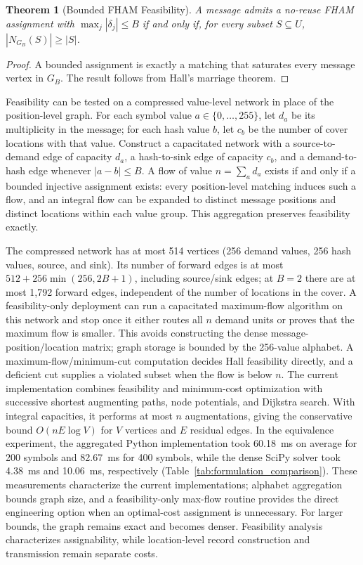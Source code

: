 \documentclass[preprint,12pt]{elsarticle}
\theoremstyle{plain}
\newtheorem{theorem}{Theorem}
\begin{document}
\begin{theorem}[Bounded FHAM Feasibility]
\label{thm:bounded_feasibility}
A message admits a no-reuse FHAM assignment with
$\max_j|\delta_j|\leq B$ if and only if, for every subset $S\subseteq U$,
$|N_{G_B}(S)|\geq|S|$.
\end{theorem}
\begin{proof}
A bounded assignment is exactly a matching that saturates every message vertex
in $G_B$. The result follows from Hall's marriage theorem.
\end{proof}

Feasibility can be tested on a compressed value-level network in place of
the position-level graph. For each symbol value $a\in\{0,\ldots,255\}$, let $d_a$ be its
multiplicity in the message; for each hash value $b$, let $c_b$ be the number
of cover locations with that value. Construct a capacitated network with a
source-to-demand edge of capacity $d_a$, a hash-to-sink edge of capacity
$c_b$, and a demand-to-hash edge whenever $|a-b|\leq B$. A flow of value
$n=\sum_a d_a$ exists if and only if a bounded injective assignment exists:
every position-level matching induces such a flow, and an integral flow can
be expanded to distinct message positions and distinct locations within each
value group. This aggregation preserves feasibility exactly.

The compressed network has at most 514 vertices (256 demand values, 256 hash
values, source, and sink). Its number of forward edges is at most
$512+256\min(256,2B+1)$, including source/sink edges; at $B=2$ there are at
most 1,792 forward edges, independent of the number of locations in the
cover. A feasibility-only deployment can run a capacitated maximum-flow
algorithm on this network and stop once it either routes all $n$ demand units
or proves that the maximum flow is smaller. This avoids constructing the
dense message-position/location matrix; graph storage is bounded by the
256-value alphabet. A maximum-flow/minimum-cut computation decides Hall
feasibility directly, and a deficient cut supplies a violated subset when the
flow is below $n$. The
current implementation combines feasibility and
minimum-cost optimization with successive shortest augmenting paths, node
potentials, and Dijkstra search. With integral capacities, it performs at
most $n$ augmentations, giving the conservative bound
$O(nE\log V)$ for $V$ vertices and $E$ residual edges. In the equivalence
experiment, the aggregated Python implementation took 60.18~ms on average
for 200 symbols and 82.67~ms for 400 symbols, while the dense SciPy solver
took 4.38~ms and 10.06~ms, respectively (Table~\ref{tab:formulation_comparison}).
These measurements characterize the current implementations; alphabet
aggregation bounds graph size, and a feasibility-only max-flow routine
provides the direct engineering option when an optimal-cost assignment is
unnecessary. For larger bounds, the graph remains exact and becomes denser.
Feasibility analysis characterizes assignability, while location-level record
construction and transmission remain separate costs.
\end{document}
